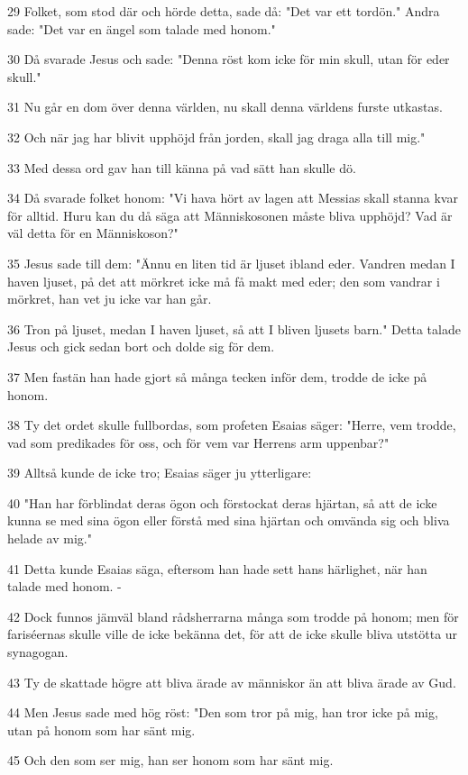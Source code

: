 \par 29 Folket, som stod där och hörde detta, sade då: "Det var ett tordön." Andra sade: "Det var en ängel som talade med honom."
\par 30 Då svarade Jesus och sade: "Denna röst kom icke för min skull, utan för eder skull."
\par 31 Nu går en dom över denna världen, nu skall denna världens furste utkastas.
\par 32 Och när jag har blivit upphöjd från jorden, skall jag draga alla till mig."
\par 33 Med dessa ord gav han till känna på vad sätt han skulle dö.
\par 34 Då svarade folket honom: "Vi hava hört av lagen att Messias skall stanna kvar för alltid. Huru kan du då säga att Människosonen måste bliva upphöjd? Vad är väl detta för en Människoson?"
\par 35 Jesus sade till dem: "Ännu en liten tid är ljuset ibland eder. Vandren medan I haven ljuset, på det att mörkret icke må få makt med eder; den som vandrar i mörkret, han vet ju icke var han går.
\par 36 Tron på ljuset, medan I haven ljuset, så att I bliven ljusets barn." Detta talade Jesus och gick sedan bort och dolde sig för dem.
\par 37 Men fastän han hade gjort så många tecken inför dem, trodde de icke på honom.
\par 38 Ty det ordet skulle fullbordas, som profeten Esaias säger: "Herre, vem trodde, vad som predikades för oss, och för vem var Herrens arm uppenbar?"
\par 39 Alltså kunde de icke tro; Esaias säger ju ytterligare:
\par 40 "Han har förblindat deras ögon och förstockat deras hjärtan, så att de icke kunna se med sina ögon eller förstå med sina hjärtan och omvända sig och bliva helade av mig."
\par 41 Detta kunde Esaias säga, eftersom han hade sett hans härlighet, när han talade med honom. -
\par 42 Dock funnos jämväl bland rådsherrarna många som trodde på honom; men för fariséernas skulle ville de icke bekänna det, för att de icke skulle bliva utstötta ur synagogan.
\par 43 Ty de skattade högre att bliva ärade av människor än att bliva ärade av Gud.
\par 44 Men Jesus sade med hög röst: "Den som tror på mig, han tror icke på mig, utan på honom som har sänt mig.
\par 45 Och den som ser mig, han ser honom som har sänt mig.

